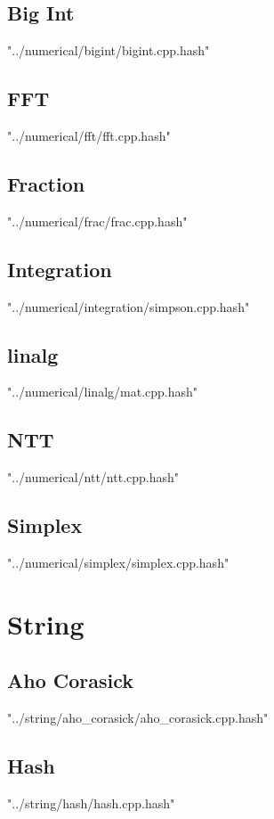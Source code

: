 \documentclass [5pt,twocolumn,oneside]{article}
\begin{document}
\begin{landscape}
\begin{multicols}{3}
\subsection{ Big Int}
 {"../numerical/bigint/bigint.cpp.hash"}


\subsection{ FFT}
 {"../numerical/fft/fft.cpp.hash"}


\subsection{ Fraction}
 {"../numerical/frac/frac.cpp.hash"}


\subsection{ Integration}
 {"../numerical/integration/simpson.cpp.hash"}


\subsection{ linalg}
 {"../numerical/linalg/mat.cpp.hash"}


\subsection{ NTT}
 {"../numerical/ntt/ntt.cpp.hash"}


\subsection{ Simplex}
 {"../numerical/simplex/simplex.cpp.hash"}



\section{String}
\subsection{ Aho Corasick}
 {"../string/aho_corasick/aho_corasick.cpp.hash"}


\subsection{ Hash}
 {"../string/hash/hash.cpp.hash"}



\end{multicols}
\end{landscape}
\end{document}
